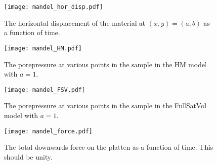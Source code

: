 \begin{figure}[htb]
\begin{center}
\texttt{[image: mandel\_hor\_disp.pdf]}
\caption{The horizontal displacement of the material at $(x,y) = (a,
  b)$ as a function of time.}
\label{mandel_hor_disp.fig}
\end{center}
\end{figure}


\begin{figure}[htb]
\begin{center}
\texttt{[image: mandel\_HM.pdf]}
\caption{The porepressure at various points in the sample in the HM
  model with $a=1$.}
\label{mandel_HM.fig}
\end{center}
\end{figure}


\begin{figure}[htb]
\begin{center}
\texttt{[image: mandel\_FSV.pdf]}
\caption{The porepressure at various points in the sample in the FullSatVol
  model with $a=1$.}
\label{mandel_FSV.fig}
\end{center}
\end{figure}

\begin{figure}[htb]
\begin{center}
\texttt{[image: mandel\_force.pdf]}
\caption{The total downwards force on the platten as a function of
  time.  This should be unity.}
\label{mandel_force.fig}
\end{center}
\end{figure}
